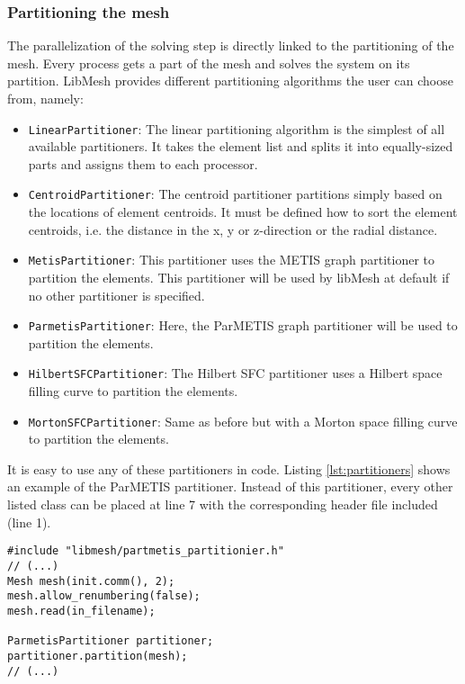   \subsubsection{Partitioning the mesh}\label{sec:Impl-Parallel-Partitioning}
   The parallelization of the solving step is directly linked to the partitioning of the mesh. Every process gets a part of the mesh and solves the system on its partition. LibMesh provides different partitioning algorithms the user can choose from, namely:
   \begin{itemize}
   	\item \texttt{LinearPartitioner}: The linear partitioning algorithm is the simplest of all available partitioners. It takes the element list and splits it into equally-sized parts and assigns them to each processor.
   	\item \texttt{CentroidPartitioner}: The centroid partitioner partitions simply based on the locations of element centroids. It must be defined how to sort the element centroids, i.e. the distance in the x, y or z-direction or the radial distance.
   	\item \texttt{MetisPartitioner}: This partitioner uses the METIS graph partitioner to partition the elements. This partitioner will be used by libMesh at default if no other partitioner is specified.
   	\item \texttt{ParmetisPartitioner}: Here, the ParMETIS graph partitioner will be used to partition the elements. %
   	\item \texttt{HilbertSFCPartitioner}: The Hilbert SFC partitioner uses a Hilbert space filling curve to partition the elements.
   	\item \texttt{MortonSFCPartitioner}: Same as before but with a Morton space filling curve to partition the elements.
   \end{itemize}
   It is easy to use any of these partitioners in code. Listing \ref{lst:partitioners} shows an example of the ParMETIS partitioner. Instead of this partitioner, every other listed class can be placed at line 7 with the corresponding header file included (line 1).
\begin{lstlisting}[caption=Mesh partitioning example,label=lst:partitioners,keepspaces=true]
#include "libmesh/partmetis_partitionier.h"
// (...)
Mesh mesh(init.comm(), 2);
mesh.allow_renumbering(false);
mesh.read(in_filename);	

ParmetisPartitioner partitioner;
partitioner.partition(mesh);
// (...)
\end{lstlisting}
  

